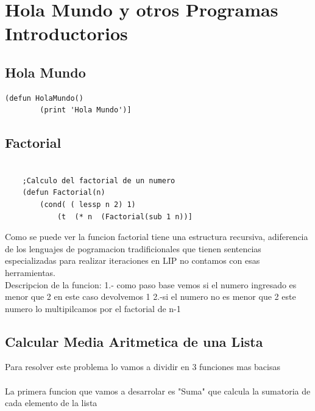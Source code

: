 \documentclass[11pt]{article} %
\begin{document}
\section{Hola Mundo y otros Programas Introductorios}


\subsection{Hola Mundo}
\lstset{language=LISP}          

\begin{lstlisting}[frame=single] 
	(defun HolaMundo()
		(print 'Hola Mundo')]

\end{lstlisting}

\subsection{Factorial}

\lstset{language=LISP}          %

\begin{lstlisting}[frame=single]
	
	;Calculo del factorial de un numero
	(defun Factorial(n)
		(cond( ( lessp n 2) 1)
			(t  (* n  (Factorial(sub 1 n))] 
\end{lstlisting}

Como se puede ver la funcion factorial tiene una estructura recursiva, adiferencia de los lenguajes de pogramacion tradificionales que tienen sentencias especializadas para realizar iteraciones en LIP no contamos con esas herramientas.\\
Descripcion de la funcion:
1.- como paso base vemos si el numero ingresado es menor que 2 en este caso devolvemos 1
2.-si el numero no es menor que 2 este numero lo multipilcamos por el factorial de n-1 

\subsection{Calcular Media Aritmetica de una Lista}

Para resolver este problema lo vamos a dividir en 3 funciones mas bacisas
\\  \\
La primera funcion que vamos a desarrolar es "Suma" que calcula la sumatoria de cada elemento de la lista
\lstset{language=LISP}          %
\end{document}
